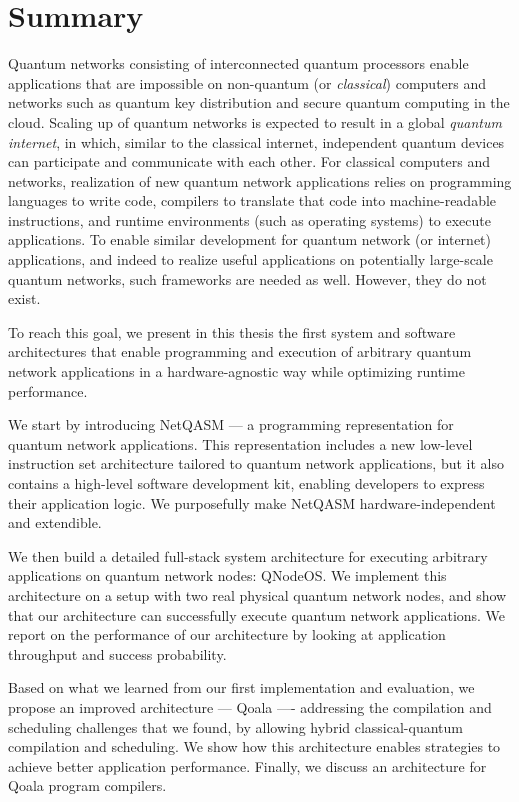 \chapter*{Summary}


Quantum networks consisting of interconnected quantum processors enable applications that are impossible on non-quantum (or \emph{classical}) computers and networks such as quantum key distribution and secure quantum computing in the cloud.
Scaling up of quantum networks is expected to result in a global \textit{quantum internet}, in which, similar to the classical internet, independent quantum devices can participate and communicate with each other.
For classical computers and networks, realization of new quantum network applications relies on programming languages to write code, compilers to translate that code into machine-readable instructions, and runtime environments (such as operating systems) to execute applications.
To enable similar development for quantum network (or internet) applications, and indeed to realize useful applications on potentially large-scale quantum networks, such frameworks are needed as well.
However, they do not exist.

To reach this goal, we present in this thesis the first system and software architectures that enable programming and execution of arbitrary quantum network applications in a hardware-agnostic way while optimizing runtime performance.

We start by introducing NetQASM --- a programming representation for quantum network applications.
This representation includes a new low-level instruction set architecture tailored to quantum network applications, but it also contains a high-level software development kit, enabling developers to express their application logic.
We purposefully make NetQASM hardware-independent and extendible.

We then build a detailed full-stack system architecture for executing arbitrary applications on quantum network nodes: QNodeOS.
We implement this architecture on a setup with two real physical quantum network nodes, and show that our architecture can successfully execute quantum network applications.
We report on the performance of our architecture by looking at application throughput and success probability.

Based on what we learned from our first implementation and evaluation, we propose an improved architecture --- Qoala ---- addressing the compilation and scheduling challenges that we found, by allowing hybrid classical-quantum compilation and scheduling.
We show how this architecture enables strategies to achieve better application performance.
Finally, we discuss an architecture for Qoala program compilers.

